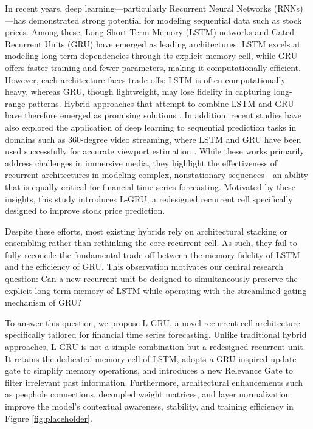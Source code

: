 \documentclass{cys}
\begin{document}
In recent years, deep learning—particularly Recurrent Neural Networks (RNNs)—has demonstrated strong potential for modeling sequential data such as stock prices. Among these, Long Short-Term Memory (LSTM) networks and Gated Recurrent Units (GRU) have emerged as leading architectures. LSTM excels at modeling long-term dependencies through its explicit memory cell, while GRU offers faster training and fewer parameters, making it computationally efficient. However, each architecture faces trade-offs: LSTM is often computationally heavy, whereas GRU, though lightweight, may lose fidelity in capturing long-range patterns. Hybrid approaches that attempt to combine LSTM and GRU have therefore emerged as promising solutions \cite{alomar2024rnns, bhavani2022comparative, karim2022stock, chavhan2024deep}. In addition, recent studies have also explored the application of deep learning to sequential prediction tasks in domains such as 360-degree video streaming, where LSTM and GRU have been used successfully for accurate viewport estimation \cite{hung2025building, nguyen2022accurate, hung2025heverl}. While these works primarily address challenges in immersive media, they highlight the effectiveness of recurrent architectures in modeling complex, nonstationary sequences—an ability that is equally critical for financial time series forecasting. Motivated by these insights, this study introduces L-GRU, a redesigned recurrent cell specifically designed to improve stock price prediction.

Despite these efforts, most existing hybrids rely on architectural stacking or ensembling rather than rethinking the core recurrent cell. As such, they fail to fully reconcile the fundamental trade-off between the memory fidelity of LSTM and the efficiency of GRU. This observation motivates our central research question: Can a new recurrent unit be designed to simultaneously preserve the explicit long-term memory of LSTM while operating with the streamlined gating mechanism of GRU?

To answer this question, we propose L-GRU, a novel recurrent cell architecture specifically tailored for financial time series forecasting. Unlike traditional hybrid approaches, L-GRU is not a simple combination but a redesigned recurrent unit. It retains the dedicated memory cell of LSTM, adopts a GRU-inspired update gate to simplify memory operations, and introduces a new Relevance Gate to filter irrelevant past information. Furthermore, architectural enhancements such as peephole connections, decoupled weight matrices, and layer normalization improve the model’s contextual awareness, stability, and training efficiency in Figure \ref{fig:placeholder}.
\end{document}
